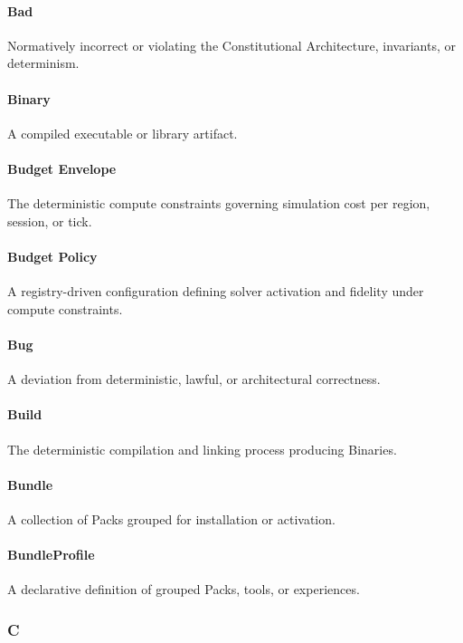 \documentclass[9pt,a4paper,openany]{book}
\begin{document}
\paragraph{Bad}
Normatively incorrect or violating the Constitutional Architecture, invariants, or determinism.\allowbreak{}


\paragraph{Binary}
A compiled executable or library artifact.\allowbreak{}


\paragraph{Budget Envelope}
The deterministic compute constraints governing simulation cost per region, session, or tick.\allowbreak{}


\paragraph{Budget Policy}
A registry-\allowbreak{}driven configuration defining solver activation and fidelity under compute constraints.\allowbreak{}


\paragraph{Bug}
A deviation from deterministic, lawful, or architectural correctness.\allowbreak{}


\paragraph{Build}
The deterministic compilation and linking process producing Binaries.\allowbreak{}


\paragraph{Bundle}
A collection of Packs grouped for installation or activation.\allowbreak{}


\paragraph{BundleProfile}
A declarative definition of grouped Packs, tools, or experiences.\allowbreak{}


\subsubsection{C}
\end{document}
